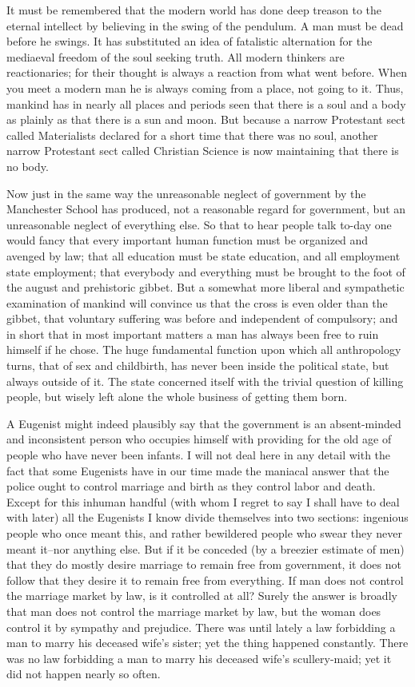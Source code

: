 \documentclass[final,10pt,letterpaper,twocolumn,openany]{book}
\begin{document}
It must be remembered that the modern world has done deep treason to
the eternal intellect by believing in the swing of the pendulum. A man
must be dead before he swings. It has substituted an idea of fatalistic
alternation for the mediaeval freedom of the soul seeking truth. All
modern thinkers are reactionaries; for their thought is always a reaction
from what went before. When you meet a modern man he is always
coming from a place, not going to it. Thus, mankind has in nearly all
places and periods seen that there is a soul and a body as plainly as that
there is a sun and moon. But because a narrow Protestant sect called
Materialists declared for a short time that there was no soul, another
narrow Protestant sect called Christian Science is now maintaining that
there is no body.

Now just in the same way the unreasonable neglect of
government by the Manchester School has produced, not a reasonable
regard for government, but an unreasonable neglect of everything else. So
that to hear people talk to-day one would fancy that every important
human function must be organized and avenged by law; that all education
must be state education, and all employment state employment; that
everybody and everything must be brought to the foot of the august and
prehistoric gibbet. But a somewhat more liberal and sympathetic
examination of mankind will convince us that the cross is even older than
the gibbet, that voluntary suffering was before and independent of
compulsory; and in short that in most important matters a man has always
been free to ruin himself if he chose. The huge fundamental function upon
which all anthropology turns, that of sex and childbirth, has never been
inside the political state, but always outside of it. The state concerned
itself with the trivial question of killing people, but wisely left alone the
whole business of getting them born. 

A Eugenist might indeed plausibly
say that the government is an absent-minded and inconsistent person who
occupies himself with providing for the old age of people who have never
been infants. I will not deal here in any detail with the fact that some
Eugenists have in our time made the maniacal answer that the police ought
to control marriage and birth as they control labor and death. Except for
this inhuman handful (with whom I regret to say I shall have to deal with
later) all the Eugenists I know divide themselves into two sections:
ingenious people who once meant this, and rather bewildered people who
swear they never meant it--nor anything else. But if it be conceded (by a
breezier estimate of men) that they do mostly desire marriage to remain
free from government, it does not follow that they desire it to remain free
from everything. If man does not control the marriage market by law, is it
controlled at all? Surely the answer is broadly that man does not control
the marriage market by law, but the woman does control it by sympathy
and prejudice. There was until lately a law forbidding a man to marry his
deceased wife's sister; yet the thing happened constantly. There was no
law forbidding a man to marry his deceased wife's scullery-maid; yet it did
not happen nearly so often. 
\end{document}
